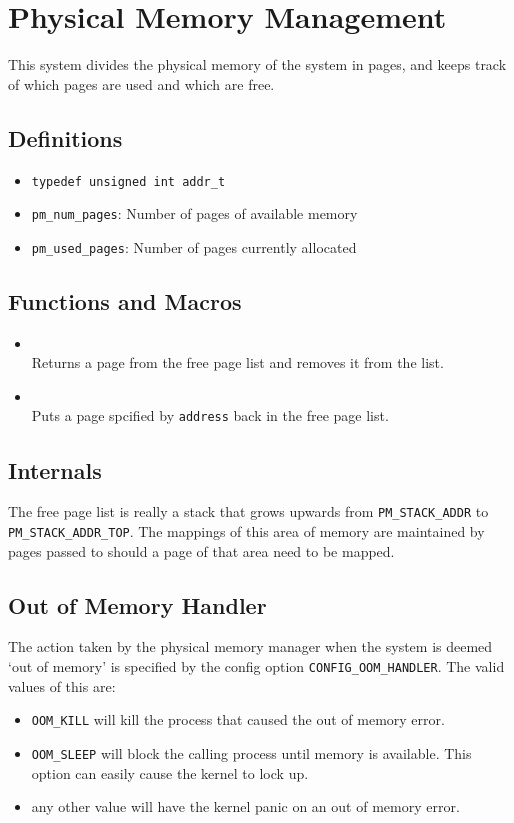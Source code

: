 \section{Physical Memory Management}
This system divides the physical memory of the system in pages, and
keeps track of which pages are used and which are free.
\subsection{Definitions}
\begin{itemize}
\item \texttt{typedef unsigned int addr\_t}
\item \texttt{pm\_num\_pages}: Number of pages of available memory
\item \texttt{pm\_used\_pages}: Number of pages currently allocated
\end{itemize}
\subsection{Functions and Macros}

\begin{itemize}
\item {} \\
Returns a page from the free page list and removes it from the list.
\item {} \\
Puts a page spcified by \texttt{address} back in the free page list.
\end{itemize}

\subsection{Internals}
The free page list is really a stack that grows upwards from \texttt{PM\_STACK\_ADDR}
to \texttt{PM\_STACK\_ADDR\_TOP}. The mappings of this area of memory are maintained by
pages passed to  should a page of that area need to be mapped.
\subsection{Out of Memory Handler}
The action taken by the physical memory manager when the system is deemed `out of memory'
is specified by the config option \texttt{CONFIG\_OOM\_HANDLER}. The valid values of this are:
\begin{itemize}
\item \texttt{OOM\_KILL} will kill the process that caused the out of memory error.
\item \texttt{OOM\_SLEEP} will block the calling process until memory is available. This option
can easily cause the kernel to lock up.
\item any other value will have the kernel panic on an out of memory error.
\end{itemize}
